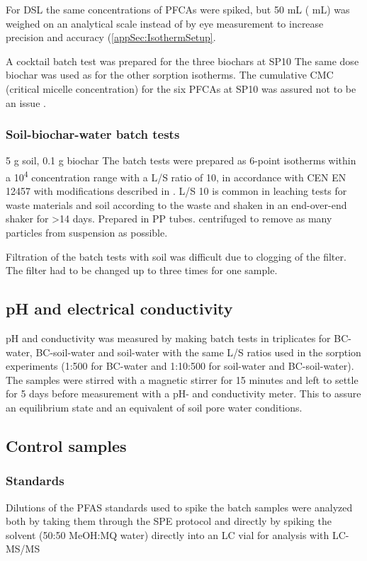 For DSL the same concentrations of PFCAs were spiked, but 50 mL ( mL) was weighed on an analytical scale instead of by eye measurement to increase precision and accuracy (\cref{appSec:IsothermSetup}.

A cocktail batch test was prepared for the three biochars at SP10  The same dose biochar was used as for the other sorption isotherms. The cumulative CMC (critical micelle concentration) for the six PFCAs at SP10 was assured not to be an issue \citep{bhhatarai2011}.

\subsubsection{Soil-biochar-water batch tests}
5  g soil, 0.1  g biochar
The batch tests were prepared as 6-point isotherms within a 10\textsuperscript{4} concentration range with a L/S ratio of 10, in accordance with CEN EN 12457 with modifications described in \citep{Hale2017fire,Kupryianchyk2016a}. L/S 10  is common in leaching tests for waste materials and soil according to the waste and shaken in an end-over-end shaker for \textgreater 14 days. Prepared in PP tubes. 
centrifuged to remove as many particles from suspension as possible.

Filtration of the batch tests with soil was difficult due to clogging of the filter. The filter had to be changed up to three times for one sample.

\subsection{pH and electrical conductivity}
pH and conductivity was measured by making batch tests in triplicates for BC-water, BC-soil-water and soil-water with the same L/S ratios used in the sorption experiments (1:500 for BC-water and 1:10:500 for soil-water and BC-soil-water). The samples were stirred with a magnetic stirrer for 15 minutes and left to settle for 5 days before measurement with a pH- and conductivity meter. This to assure an equilibrium state and an equivalent of soil pore water conditions.

\subsection{Control samples}
\subsubsection{Standards}
Dilutions of the PFAS standards used to spike the batch samples were analyzed both by taking them through the SPE protocol and directly by spiking the solvent (50:50 MeOH:MQ water) directly into an LC vial for analysis with LC-MS/MS 

